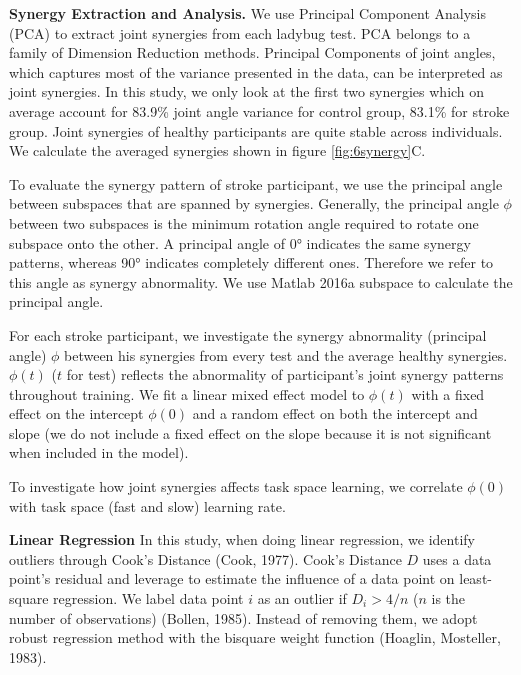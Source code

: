 \textbf{Synergy Extraction and Analysis.}
We use Principal Component Analysis (PCA) to extract joint synergies from each ladybug test.
PCA belongs to a family of Dimension Reduction methods.
Principal Components of joint angles, which captures most of the variance presented in the data, can be interpreted as joint synergies.%
In this study, we only look at the first two synergies which on average account for 83.9\% joint angle variance for control group, 83.1\% for stroke group.
Joint synergies of healthy participants are quite stable across individuals.
We calculate the averaged synergies shown in figure \ref{fig:6synergy}C.

To evaluate the synergy pattern of stroke participant, we use the principal angle %
 between subspaces that are spanned by synergies.%
Generally, the principal angle $ \phi $ between two subspaces is the minimum rotation angle required to rotate one subspace onto the other.
A principal angle of \ang{0} indicates the same synergy patterns, whereas \ang{90} indicates completely different ones.
Therefore we refer to this angle as synergy abnormality.
We use Matlab 2016a \textsf{subspace} %
 to calculate the principal angle. 

For each stroke participant, we investigate the synergy abnormality (principal angle) $ \phi $ between his synergies from every test and the average healthy synergies.
$ \phi(t) $ ($ t $ for test) reflects the abnormality of participant's joint synergy patterns throughout training. 
We fit a linear mixed effect model to $ \phi(t) $ with a fixed effect on the intercept $ \phi(0) $ and a random effect on both the intercept and slope (we do not include a fixed effect on the slope because it is not significant when included in the model).

To investigate how joint synergies affects task space learning, we correlate $ \phi(0) $ with task space (fast and slow) learning rate.

\textbf{Linear Regression}
In this study, when doing linear regression, we identify outliers through Cook's Distance (Cook, 1977).
Cook's Distance $ D $ uses a data point's residual and leverage \cite{Chatterjee1986} to estimate the influence of a data point on least-square regression.
We label data point $ i $ as an outlier if $ D_i > 4/n $ ($ n $ is the number of observations) (Bollen, 1985). %
Instead of removing them, we adopt robust regression method with the bisquare weight function (Hoaglin, Mosteller, 1983).

